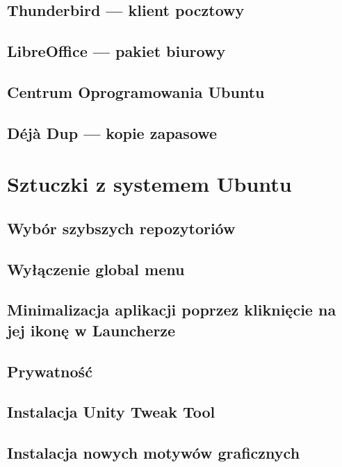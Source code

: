 \documentclass[a4paper,11pt,oneside]{mwart}
\begin{document}
		\subsection{Thunderbird --- klient pocztowy}
		\subsection{LibreOffice --- pakiet biurowy}
			 
		\subsection{Centrum Oprogramowania Ubuntu}
			
		\subsection{Déjà Dup --- kopie zapasowe}
			
	\section{Sztuczki z systemem Ubuntu}
		
		\subsection{Wybór szybszych repozytoriów}
			
		\subsection{Wyłączenie global menu}
			
		\subsection{Minimalizacja aplikacji poprzez kliknięcie na jej ikonę w Launcherze}
			
		\subsection{Prywatność}
			
		\subsection{Instalacja Unity Tweak Tool}
			
		\subsection{Instalacja nowych motywów graficznych}
			
\end{document}
